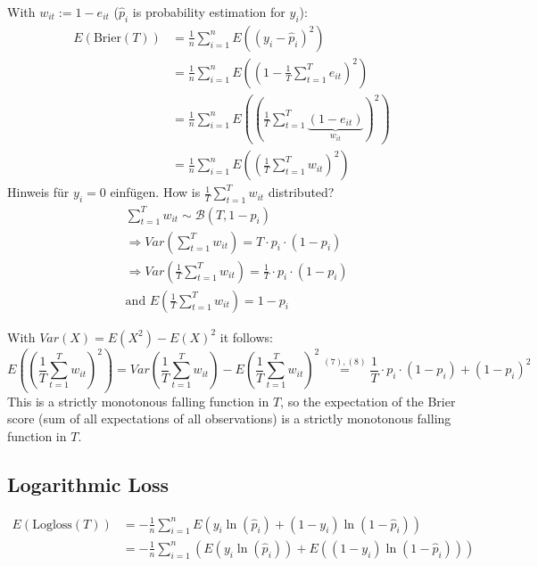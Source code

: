 \documentclass[paper=a4
               ,12pt
               ,DIV=12
               ,parskip=half
               ,titlepage=on
               ,headinclude 
               ,footinclude
               ,headsepline
               ,footsepline         %
               ,ilines 
               ]{scrartcl}
\begin{document}
With $w_{it} := 1-e_{it}$ ($\hat{p}_i$ is probability estimation for $y_i$):
\begin{align}
 E(\text{Brier}(T)) & = \frac{1}{n} \sum_{i=1}^{n} E((y_i - \hat{p}_i ) ^2) \nonumber \\
                    & = \frac{1}{n} \sum_{i=1}^{n} E((1 - \frac{1}{T} \sum_{t=1}^{T} e_{it} ) ^2) \nonumber \\
                    & = \frac{1}{n} \sum_{i=1}^{n} E((\frac{1}{T} \sum_{t=1}^{T} \underbrace{(1 - e_{it})}_{w_{it}} ) ^2) \nonumber \\
                    & = \frac{1}{n} \sum_{i=1}^{n} E((\frac{1}{T} \sum_{t=1}^{T} w_{it} )^2)  \nonumber
\end{align} 
Hinweis für $y_i = 0$ einfügen. 
 How is $\frac{1}{T} \sum_{t=1}^{T} w_{it} $ distributed? 
 \begin{align}
 &\sum_{t=1}^{T} w_{it} \sim \mathcal{B}(T, 1 - p_i) \nonumber \\
 &\Rightarrow Var(\sum_{t=1}^{T} w_{it}) = T \cdot p_i \cdot (1-p_i)  \nonumber \\
 &\Rightarrow Var( \frac{1}{T} \sum_{t=1}^{T} w_{it}) = \frac{1}{T} \cdot p_i \cdot (1-p_i) \\
 & \text{and }  E( \frac{1}{T} \sum_{t=1}^{T} w_{it}) = 1-p_i
\end{align}

With $Var(X) = E(X^2) - E(X)^2$ it follows:
\begin{equation} 
E((\frac{1}{T} \sum_{t=1}^{T} w_{it} )^2) = Var( \frac{1}{T} \sum_{t=1}^{T} w_{it}) - E( \frac{1}{T} \sum_{t=1}^{T} w_{it})^2 \stackrel{(7), (8)}{=} \frac{1}{T} \cdot p_i \cdot (1-p_i) + (1-p_i)^2 \nonumber
\end{equation}
This is a strictly monotonous falling function in $T$, so the expectation of the Brier score (sum of all expectations of all observations) is a strictly monotonous falling function in $T$. 

\subsection{Logarithmic Loss}

\begin{align}
E(\text{Logloss}(T)) & = -\frac{1}{n} \sum_{i=1}^{n} E(y_i \ln(\hat{p}_i) + (1 - y_i) \ln(1-\hat{p}_i)) \nonumber \\
                     & = -\frac{1}{n} \sum_{i=1}^{n} ( E(y_i \ln(\hat{p}_i)) + E ((1 - y_i) \ln(1-\hat{p}_i))) \nonumber
\end{align}
\end{document}
